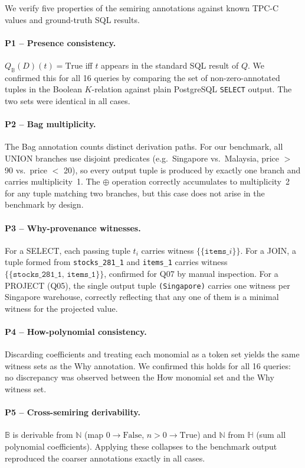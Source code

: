 \documentclass{llncs}
\begin{document}
We verify five properties of the semiring annotations against
known TPC-C values and ground-truth SQL results.

\paragraph{P1 -- Presence consistency.}
$Q_{\mathbb{B}}(D)(t) = \mathrm{True}$ iff $t$ appears in the
standard SQL result of $Q$. We confirmed this for all 16 queries by
comparing the set of non-zero-annotated tuples in the Boolean
$K$-relation against plain PostgreSQL \texttt{SELECT} output.
The two sets were identical in all cases.

\paragraph{P2 -- Bag multiplicity.}
The Bag annotation counts distinct derivation paths.
For our benchmark, all UNION branches use disjoint predicates
(e.g.\ Singapore vs.\ Malaysia, price $>$ 90 vs.\ price $<$ 20),
so every output tuple is produced by exactly one branch and carries
multiplicity~1. The $\oplus$ operation correctly accumulates to
multiplicity~2 for any tuple matching two branches, but this case
does not arise in the benchmark by design.

\paragraph{P3 -- Why-provenance witnesses.}
For a SELECT, each passing tuple $t_i$ carries witness
$\{\{\texttt{items\_}i\}\}$. For a JOIN, a tuple formed from
\texttt{stocks\_281\_1} and \texttt{items\_1} carries witness
$\{\{\texttt{stocks\_281\_1},\, \texttt{items\_1}\}\}$,
confirmed for Q07 by manual inspection. For a PROJECT (Q05), the
single output tuple \texttt{(Singapore)} carries one witness per
Singapore warehouse, correctly reflecting that any one of them
is a minimal witness for the projected value.

\paragraph{P4 -- How-polynomial consistency.}
Discarding coefficients and treating each monomial as a token set
yields the same witness sets as the Why annotation. We confirmed
this holds for all 16 queries: no discrepancy was observed between
the How monomial set and the Why witness set.

\paragraph{P5 -- Cross-semiring derivability.}
$\mathbb{B}$ is derivable from $\mathbb{N}$ (map $0 \to \mathrm{False}$,
$n>0 \to \mathrm{True}$) and $\mathbb{N}$ from $\mathbb{H}$ (sum all
polynomial coefficients). Applying these collapses to the benchmark
output reproduced the coarser annotations exactly in all cases.
\end{document}
